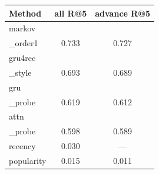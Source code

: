 \begin{tabular}{lcc}
\toprule
Method & all R@5 & advance R@5 \\
\midrule
markov\\_order1 & 0.733 & 0.727 \\
gru4rec\\_style & 0.693 & 0.689 \\
gru\\_probe & 0.619 & 0.612 \\
attn\\_probe & 0.598 & 0.589 \\
recency & 0.030 & — \\
popularity & 0.015 & 0.011 \\
\bottomrule
\end{tabular}
